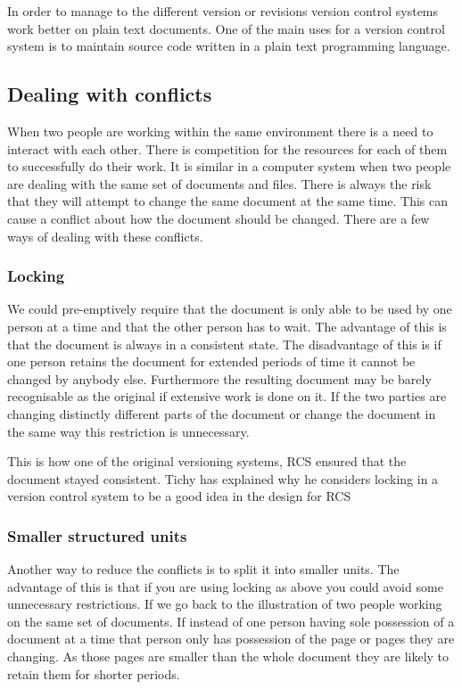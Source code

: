 In order to manage to the different version or revisions version control systems work better on plain text documents. One of the main uses for a version control system is to maintain source code written in a plain text programming language.



\subsection{Dealing with conflicts}
When two people are working within the same environment there is a need to interact with each other.
There is competition for the resources for each of them to successfully do their work.
It is similar in a computer system when two people are dealing with the same set of documents and files.
There is always the risk that they will attempt to change the same document at the same time.
This can cause a conflict about how the document should be changed.
There are a few ways of dealing with these conflicts.

\subsubsection{Locking}
We could pre-emptively require that the document is only able to be used by one person at a time and that the other person has to wait. The advantage of this is that the document is always in a consistent state. The disadvantage of this is if one person retains the document for extended periods of time it cannot be changed by anybody else. Furthermore the resulting document may be barely recognisable as the original if extensive work is done on it. If the two parties are changing distinctly different parts of the document or change the document in the same way this restriction is unnecessary.

This is how one of the original versioning systems, RCS ensured that the document stayed consistent. Tichy has explained why he considers locking in a version control system to be a good idea in the design for RCS\cite{Tichy1982}

\subsubsection{Smaller structured units}
Another way to reduce the conflicts is to split it into smaller units.  The advantage of this is that if you are using locking as above you could avoid some unnecessary restrictions. If we go back to the illustration of two people working on the same set of documents.  If instead of one person having sole possession of a document at a time that person only has possession of the page or pages they are changing. As those pages are smaller than the whole document they are likely to retain them for shorter periods.
